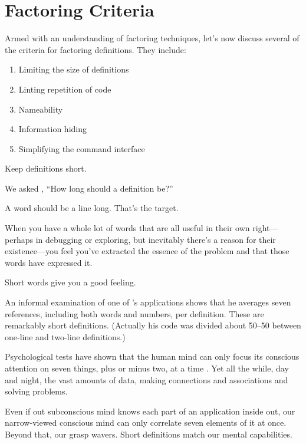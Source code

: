 \section{Factoring Criteria}
Armed with an understanding of factoring techniques, let's now discuss
several of the criteria for factoring \Forth{} definitions. They
include:

\begin{enumerate}
\item Limiting the size of definitions
\item Linting repetition of code
\item Nameability
\item Information hiding
\item Simplifying the command interface
\end{enumerate}

\begin{tip}
Keep definitions short.
\end{tip}

\begin{interview}
We asked ,
``How long should a \Forth{} definition be?''

\begin{tfquot}
A word should be a line long. That's the target.

When you have a whole lot of words that are all useful in their own
right---perhaps in debugging or exploring, but inevitably there's a
reason for their existence---you feel you've extracted the essence of
the problem and that those words have expressed it.

Short words give you a good feeling.
\end{tfquot}
\end{interview}
An informal examination of one of 's applications shows
that he averages seven references, including both words and numbers,
per definition. These are remarkably short definitions. (Actually his
code was divided about 50--50 between one-line and two-line
definitions.)

Psychological tests have shown that the human mind can only focus its
conscious attention on seven things, plus or minus two, at a time
\cite{miller56}. Yet all the while, day and night, the vast amounts of
data, making connections and associations and solving problems.

Even if out subconscious mind knows each part of an application inside
out, our narrow-viewed conscious mind can only correlate seven
elements of it at once. Beyond that, our grasp wavers. Short
definitions match our mental capabilities.

